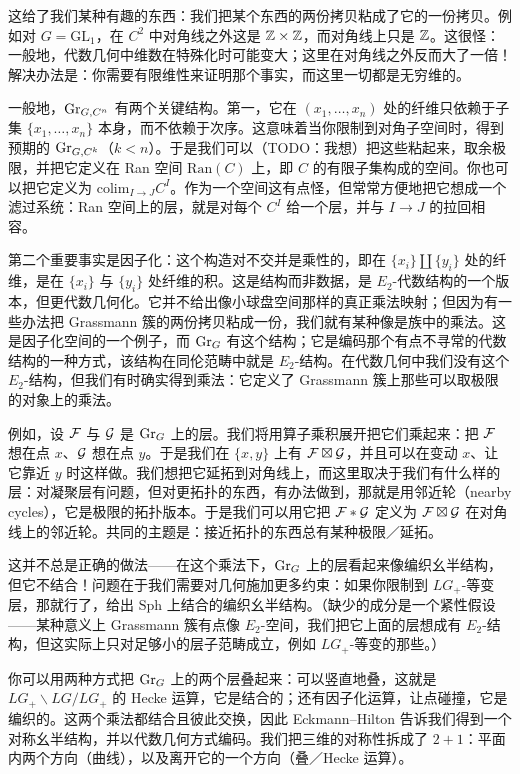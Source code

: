 这给了我们某种有趣的东西：我们把某个东西的两份拷贝粘成了它的一份拷贝。例如对 $G=\mathrm{GL}_1$，在 $C^2$ 中对角线之外这是 $\mathbb{Z}\times\mathbb{Z}$，而对角线上只是 $\mathbb{Z}$。这很怪：一般地，代数几何中维数在特殊化时可能变大；这里在对角线之外反而大了一倍！解决办法是：你需要有限维性来证明那个事实，而这里一切都是无穷维的。

一般地，$\mathrm{Gr}_{G,C^n}$ 有两个关键结构。第一，它在 $(x_1,\dots,x_n)$ 处的纤维只依赖于子集 $\{x_1,\dots,x_n\}$ 本身，而不依赖于次序。这意味着当你限制到对角子空间时，得到预期的 $\mathrm{Gr}_{G,C^k}$（$k<n$）。于是我们可以（TODO：我想）把这些粘起来，取余极限，并把它定义在 Ran 空间 $\mathrm{Ran}(C)$ 上，即 $C$ 的有限子集构成的空间。你也可以把它定义为 $\mathrm{colim}_{I\to J}C^I$。作为一个空间这有点怪，但常常方便地把它想成一个滤过系统：Ran 空间上的层，就是对每个 $C^I$ 给一个层，并与 $I\to J$ 的拉回相容。

第二个重要事实是因子化：这个构造对不交并是乘性的，即在 $\{x_i\}\amalg\{y_i\}$ 处的纤维，是在 $\{x_i\}$ 与 $\{y_i\}$ 处纤维的积。这是结构而非数据，是 $E_2$-代数结构的一个版本，但更代数几何化。它并不给出像小球盘空间那样的真正乘法映射；但因为有一些办法把 Grassmann 簇的两份拷贝粘成一份，我们就有某种像是族中的乘法。这是因子化空间的一个例子，而 $\mathrm{Gr}_G$ 有这个结构；它是编码那个有点不寻常的代数结构的一种方式，该结构在同伦范畴中就是 $E_2$-结构。在代数几何中我们没有这个 $E_2$-结构，但我们有时确实得到乘法：它定义了 Grassmann 簇上那些可以取极限的对象上的乘法。

例如，设 $\mathcal{F}$ 与 $\mathcal{G}$ 是 $\mathrm{Gr}_G$ 上的层。我们将用算子乘积展开把它们乘起来：把 $\mathcal{F}$ 想在点 $x$、$\mathcal{G}$ 想在点 $y$。于是我们在 $\{x,y\}$ 上有 $\mathcal{F}\boxtimes\mathcal{G}$，并且可以在变动 $x$、让它靠近 $y$ 时这样做。我们想把它延拓到对角线上，而这里取决于我们有什么样的层：对凝聚层有问题，但对更拓扑的东西，有办法做到，那就是用邻近轮（nearby cycles），它是极限的拓扑版本。于是我们可以用它把 $\mathcal{F}*\mathcal{G}$ 定义为 $\mathcal{F}\boxtimes\mathcal{G}$ 在对角线上的邻近轮。共同的主题是：接近拓扑的东西总有某种极限／延拓。

这并不总是正确的做法——在这个乘法下，$\mathrm{Gr}_G$ 上的层看起来像编织幺半结构，但它不结合！问题在于我们需要对几何施加更多约束：如果你限制到 $LG_+$-等变层，那就行了，给出 $\mathrm{Sph}$ 上结合的编织幺半结构。（缺少的成分是一个紧性假设——某种意义上 Grassmann 簇有点像 $E_2$-空间，我们把它上面的层想成有 $E_2$-结构，但这实际上只对足够小的层子范畴成立，例如 $LG_+$-等变的那些。）

你可以用两种方式把 $\mathrm{Gr}_G$ 上的两个层叠起来：可以竖直地叠，这就是 $LG_+\backslash LG/LG_+$ 的 Hecke 运算，它是结合的；还有因子化运算，让点碰撞，它是编织的。这两个乘法都结合且彼此交换，因此 Eckmann–Hilton 告诉我们得到一个对称幺半结构，并以代数几何方式编码。我们把三维的对称性拆成了 $2+1$：平面内两个方向（曲线），以及离开它的一个方向（叠／Hecke 运算）。

